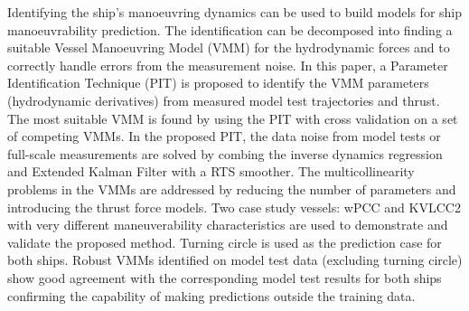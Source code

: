 Identifying the ship's manoeuvring dynamics can be used to build models for ship manoeuvrability prediction. The identification can be decomposed into finding a suitable Vessel Manoeuvring Model (VMM) for the hydrodynamic forces and to correctly handle errors from the measurement noise. 
In this paper, a Parameter Identification Technique (PIT) is proposed to identify  the VMM parameters (hydrodynamic derivatives) from measured model test trajectories and thrust. The most suitable VMM is found by using the PIT with cross validation on a set of competing VMMs.
In the proposed PIT, the data noise from model tests or full-scale measurements are solved by combing the inverse dynamics regression and Extended Kalman Filter with a RTS smoother. The multicollinearity problems in the VMMs are addressed by reducing the number of parameters and introducing the thrust force models. Two case study vessels: wPCC and KVLCC2 with very different maneuverability characteristics are used to demonstrate and validate the proposed method. 
Turning circle is used as the prediction case for both ships. Robust VMMs identified on model test data (excluding turning circle) show good agreement with the corresponding model test results for both ships confirming the capability of making predictions outside the training data.
